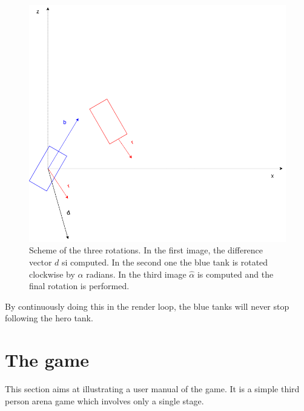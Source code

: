 \documentclass[14pt]{article}
\begin{document}
\begin{figure}[H]
\begin{minipage}[t]{0.6\textwidth}
\end{minipage}
\begin{minipage}[t]{0.6\textwidth}
\center
\includegraphics[width=\textwidth]{diagrams/chartSecondRot.png}
\end{minipage}
\caption{Scheme of the three rotations. In the first image, the difference vector \(d\) si computed. In the second one the blue tank is rotated clockwise by \(\alpha\) radians. In the third image \(\hat{\alpha}\) is computed and the final rotation is performed.}
\label{img:threeOrientations}
\end{figure}




By continuously doing this in the render loop, the blue tanks will never stop following the hero tank. 
\section{The game}
This section aims at illustrating a user manual of the game. It is a simple third person arena game which involves only a single stage. \\
\end{document}
